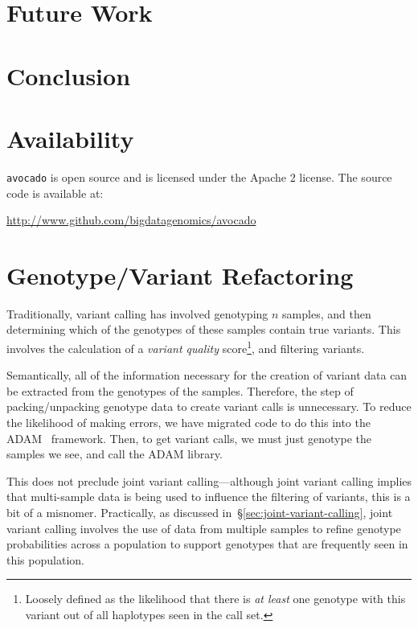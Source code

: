 \documentclass{acm_proc_article-sp}
\begin{document}

\section{Future Work}
\label{sec:future-work}


\section{Conclusion}
\label{sec:conclusion}

\appendix

\section{Availability}
\label{sec:availability}

\texttt{avocado} is open source and is licensed under the Apache 2 license. The source code is available at:

\url{http://www.github.com/bigdatagenomics/avocado}

\section{Genotype/Variant Refactoring}
\label{sec:genotype-variant-refactoring}

Traditionally, variant calling has involved genotyping $n$ samples, and then determining which of the genotypes of these samples
contain true variants. This involves the calculation of a \textit{variant quality} score\footnote{Loosely defined as the likelihood that
there is \emph{at least} one genotype with this variant out of all haplotypes seen in the call set.}, and filtering variants.

Semantically, all of the information necessary for the creation of variant data can be extracted from the genotypes of the samples.
Therefore, the step of packing/unpacking genotype data to create variant calls is unnecessary. To reduce the likelihood of making
errors, we have migrated code to do this into the ADAM~\cite{massie13} framework. Then, to get variant calls, we must just genotype
the samples we see, and call the ADAM library.

This does not preclude joint variant calling---although joint variant calling implies that multi-sample data is being used to influence
the filtering of variants, this is a bit of a misnomer. Practically, as discussed in~\S\ref{sec:joint-variant-calling}, joint variant calling
involves the use of data from multiple samples to refine genotype probabilities across a population to support genotypes that are
frequently seen in this population.

%

  

\balancecolumns
\end{document}
